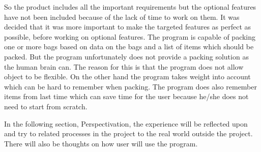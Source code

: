 So the product includes all the important requirements but the optional features have not been included because of the lack of time to work on them. It was decided that it was more important to make the targeted features as perfect as possible, before working on optional features. The program is capable of packing one or more bags based on data on the bags and a list of items which should be packed. But the program unfortunately does not provide a packing solution as the human brain can. The reason for this is that the program does not allow object to be flexible. On the other hand the program takes weight into account which can be hard to remember when packing. The program does also remember items from last time which can save time for the user because he/she does not need to start from scratch.

In the following section, Perspectivation, the experience will be reflected upon and try to related processes in the project to the real world outside the project. There will also be thoughts on how user will use the program.